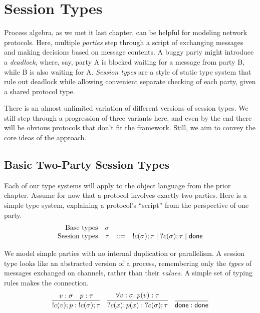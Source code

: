 \documentclass{amsbook}
\theoremstyle{definition}
\theoremstyle{remark}
\numberwithin{section}{chapter}
\numberwithin{equation}{chapter}
\begin{document}

\newcommand{\compl}[1]{\overline{#1}}
\newcommand{\channels}[0]{\mathcal C}
\newcommand{\mpty}[4]{#1 :_{#2,#3} #4}
\newcommand{\mptys}[3]{#1 :_{#2} #3}

\chapter{Session Types}

Process algebra, as we met it last chapter, can be helpful for modeling network protocols.
Here, multiple \emph{parties} step through a script of exchanging messages and making decisions based on message contents.
A buggy party might introduce a \emph{deadlock}, where, say, party A is blocked waiting for a message from party B, while B is also waiting for A.
\emph{Session types} are a style of static type system that rule out deadlock while allowing convenient separate checking of each party, given a shared protocol type.

There is an almost unlimited variation of different versions of session types.
We still step through a progression of three variants here, and even by the end there will be obvious protocols that don't fit the framework.
Still, we aim to convey the core ideas of the approach.

\section{Basic Two-Party Session Types}

Each of our type systems will apply to the object language from the prior chapter.
Assume for now that a protocol involves exactly two parties.
Here is a simple type system, explaining a protocol's ``script'' from the perspective of one party.
$$\begin{array}{rrcl}
  \textrm{Base types} & \sigma \\
  \textrm{Session types} & \tau &::=& !c(\sigma); \tau \mid \; ?c(\sigma); \tau \mid \mathsf{done}
\end{array}$$

\abstraction
We model simple parties with no internal duplication or parallelism.
A session type looks like an abstracted version of a process, remembering only the \emph{types} of messages exchanged on channels, rather than their \emph{values}.
A simple set of typing rules makes the connection.
$$\infer{\send{c}{v}{p} : \; \send{c}{\sigma}{\tau}}{
  v : \sigma
  & p : \tau
}
\quad \infer{\recv{c}{x}{p(x)} : \; \recv{c}{\sigma}{\tau}}{
  \forall v : \sigma. \; p(v) : \tau
}
\quad \infer{\done : \done}{}$$
\end{document}
